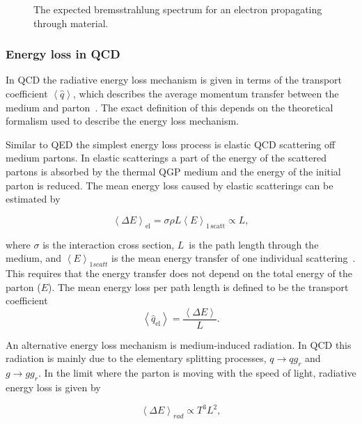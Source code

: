 \begin{figure}[htb]
\centering


\caption[Photon spectrum]{ The expected bremsstrahlung spectrum for an electron propagating through material.}
\label{fig:bremsstrahlung}
\end{figure}

\subsubsection*{Energy loss in QCD}
In QCD the radiative energy loss mechanism is given in terms of the transport coefficient $\left<\hat q\right>$, which describes the average momentum transfer between the medium and parton~\cite{jetBroadeningPpb1}. The exact definition of this depends on the theoretical formalism used to describe the energy loss mechanism. 

Similar to QED the simplest energy loss process is elastic QCD scattering off medium partons. In elastic scatterings a part of the energy of the scattered partons is absorbed by the thermal QGP medium and the energy of the initial parton is reduced. The mean energy loss caused by elastic scatterings can be estimated by

\begin{equation}
\left<\Delta E\right>_{\mathrm{el}}=\sigma \rho L \left<E\right>_{\mathrm{1\,scatt}}\propto L,
\label{eq:elastic}
\end{equation}

\noindent where $\sigma$ is the interaction cross section, $L$ is the path length through the medium, and $\left<E\right>_{1 scatt}$ is the mean energy transfer of one individual scattering~\cite{Majumder:2010qh}. This requires that the energy transfer does not depend on the total energy of the parton ($E$). The mean energy loss per path length is defined to be the transport coefficient \begin{equation}
\left< \hat q_\mathrm{el}\right> = \frac{\left< \Delta E\right>}{L}.
\end{equation}

\noindent An alternative energy loss mechanism is medium-induced radiation. In QCD this radiation is mainly due to the elementary splitting processes, $q\rightarrow qg_r$ and $g\rightarrow gg_r$. In the limit where the parton is moving with the speed of light, radiative energy loss is given by

\begin{equation}
\left<\Delta E\right>_{rad}\propto T^3L^2,
\label{eq:radiative}
\end{equation}

